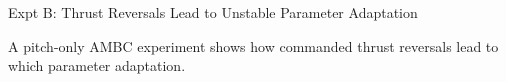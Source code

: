 \begin{frame}{Expt B: Thrust Reversals Lead to Unstable Parameter Adaptation}

  A pitch-only AMBC experiment shows how \alert<2-3>{commanded thrust
    reversals} lead to  which
   parameter adaptation.

\begin{columns}


      \begin{center}
      \end{center}   


\end{columns}
\end{frame}
